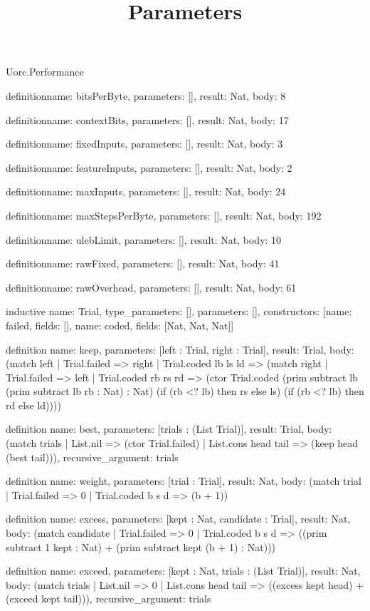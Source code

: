 \begin{lexlean}{Uorc.Performance}
\title{Parameters}
\begin{semanticmodule}
definition{name: bitsPerByte, parameters: [], result: Nat, body: 8}

definition{name: contextBits, parameters: [], result: Nat, body: 17}

definition{name: fixedInputs, parameters: [], result: Nat, body: 3}

definition{name: featureInputs, parameters: [], result: Nat, body: 2}

definition{name: maxInputs, parameters: [], result: Nat, body: 24}

definition{name: maxStepsPerByte, parameters: [], result: Nat, body: 192}

definition{name: ulebLimit, parameters: [], result: Nat, body: 10}

definition{name: rawFixed, parameters: [], result: Nat, body: 41}

definition{name: rawOverhead, parameters: [], result: Nat, body: 61}

inductive{
  name: Trial,
  type_parameters: [],
  parameters: [],
  constructors: [{name: failed, fields: []}, {name: coded, fields: [Nat, Nat, Nat]}]
}

definition{
  name: keep,
  parameters: [left : Trial, right : Trial],
  result: Trial,
  body: (match left
    | Trial.failed => right
    | Trial.coded lb ls ld => (match right
      | Trial.failed => left
      | Trial.coded rb rs rd => (ctor Trial.coded (prim subtract lb (prim subtract lb rb : Nat) : Nat) (if (rb <? lb) then rs else ls) (if (rb <? lb) then rd else ld))))
}

definition{
  name: best,
  parameters: [trials : (List Trial)],
  result: Trial,
  body: (match trials
    | List.nil => (ctor Trial.failed)
    | List.cons head tail => (keep head (best tail))),
  recursive_argument: trials
}

definition{
  name: weight,
  parameters: [trial : Trial],
  result: Nat,
  body: (match trial | Trial.failed => 0 | Trial.coded b s d => (b + 1))
}

definition{
  name: excess,
  parameters: [kept : Nat, candidate : Trial],
  result: Nat,
  body: (match candidate
    | Trial.failed => 0
    | Trial.coded b s d => ((prim subtract 1 kept : Nat) + (prim subtract kept (b + 1) : Nat)))
}

definition{
  name: exceed,
  parameters: [kept : Nat, trials : (List Trial)],
  result: Nat,
  body: (match trials
    | List.nil => 0
    | List.cons head tail => ((excess kept head) + (exceed kept tail))),
  recursive_argument: trials
}


\end{semanticmodule}
\end{lexlean}
